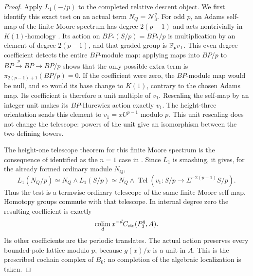 \begin{proof}
Apply \(L_1(-/p)\) to the completed relative descent object.
We first identify this exact test on an actual term \(N_Q=\mathcal N_3^q\).
For odd \(p\), an Adams self-map of the finite Moore spectrum has degree
\(2(p-1)\) and acts nontrivially in \(K(1)\)-homology
\cite[Example~2.4.1(ii)]{RavenelNilpotence}.  Its action on
\(BP_*(S/p)=BP_*/p\) is multiplication by an element of degree
\(2(p-1)\), and that graded group is \(\mathbb F_p v_1\).  This even-degree
coefficient detects the entire \(BP\)-module map: applying maps into
\(BP/p\) to \(BP\xrightarrow p BP\to BP/p\) shows that the only
possible extra term is \(\pi_{2(p-1)+1}(BP/p)=0\).  If the coefficient
were zero, the \(BP\)-module map would be null, and so would its base
change to \(K(1)\), contrary to the chosen Adams map.  Its coefficient
is therefore a unit multiple of \(v_1\).  Rescaling the self-map by an
integer unit makes its \(BP\)-Hurewicz action exactly \(v_1\).
The height-three orientation sends this element to \(v_1=xU^{p-1}\)
modulo \(p\).  This unit rescaling does not change the telescope:
powers of the unit give an isomorphism between the two defining towers.

The height-one telescope theorem for this finite Moore spectrum is the
consequence of \cite[Theorem~4.11 and Corollary~4.12]{Miller1981}
identified as the \(n=1\) case in
\cite[Section~7.5, after Conjecture~7.5.5]{RavenelNilpotence}.
Since \(L_1\) is smashing, it gives, for the already formed ordinary
module \(N_Q\),
\[
 L_1(N_Q/p)\simeq N_Q\wedge L_1(S/p)
       \simeq N_Q\wedge\operatorname{Tel}(v_1:S/p\to\Sigma^{-2(p-1)}S/p).
\]
Thus the test is a termwise ordinary telescope of the same finite Moore
self-map.  Homotopy groups commute with that telescope.  In internal
degree zero the resulting coefficient is exactly
\[
 \operatorname*{colim}_d x^{-d}C_{\mathrm{cts}}(P_3^q,A).
\]
Its other coefficients are the periodic translates.  The actual action
preserves every bounded-pole lattice modulo \(p\), because
\(g(x)/x\) is a unit in \(A\).  This is the prescribed cochain complex
of \(B_0\); no completion of the algebraic localization is taken.


\end{proof}
